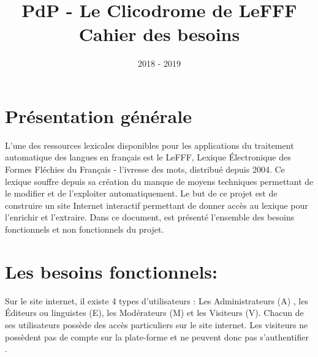 \documentclass{article}
\title{PdP - Le Clicodrome de LeFFF \\ Cahier des besoins}
\author{}
\date{2018 - 2019}
\begin{document}
\maketitle

\section{Présentation générale }
L'une des ressources lexicales disponibles pour les applications du traitement automatique des langues en français est le LeFFF, Lexique Électronique des Formes Fléchies du Français - l'ivresse des mots, distribué depuis 2004.
\smallbreak
Ce lexique souffre depuis sa création du manque de moyens techniques permettant de le modifier et de l'exploiter automatiquement.
\smallbreak
Le but de ce projet est de construire un site Internet interactif permettant de donner accès au lexique pour l'enrichir et l'extraire.
\smallbreak
Dans ce document, est présenté l'ensemble des besoins fonctionnels et non fonctionnels du projet.


\section{Les besoins fonctionnels:}

Sur le site internet, il existe 4 types d’utilisateurs : Les Administrateurs (A) , les Éditeurs ou linguistes (E), les Modérateurs (M) et les Visiteurs (V).
Chacun de ses utilisateurs possède des accès particuliers sur le site internet.
Les visiteurs ne possèdent pas de compte sur la plate-forme et ne peuvent donc pas s'authentifier . 
\end{document}
